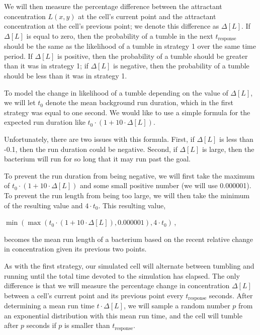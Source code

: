 We will then measure the percentage difference between the attractant concentration $L(x,y)$ at the cell's current point and the attractant concentration at the cell's previous point; we denote this difference as $\Delta[L]$. If $\Delta[L]$ is equal to zero, then the probability of a tumble in the next $t_{\text{response}}$ should be the same as the likelihood of a tumble in strategy 1 over the same time period. If $\Delta[L]$ is positive, then the probability of a tumble should be greater than it was in strategy 1; if $\Delta[L]$ is negative, then the probability of a tumble should be less than it was in strategy 1.

To model the change in likelihood of a tumble depending on the value of $\Delta[L]$, we will let $t_0$ denote the mean background run duration, which in the first strategy was equal to one second. We would like to use a simple formula for the expected run duration like $t_0 \cdot (1 + 10 \cdot \Delta[L])$.

Unfortunately, there are two issues with this formula. First, if $\Delta[L]$ is less than -0.1, then the run duration could be negative. Second, if $\Delta[L]$ is large, then the bacterium will run for so long that it may run past the goal.

To prevent the run duration from being negative, we will first take the maximum of $t_0 \cdot (1 + 10 \cdot \Delta [L])$ and some small positive number (we will use 0.000001). To prevent the run length from being too large, we will then take the minimum of the resulting value and $4 \cdot t_0$. This resulting value,

\begin{center}
$\min\left(\max(t_0 \cdot (1 + 10 \cdot \Delta [L]), 0.000001), 4 \cdot t_0\right)$\,,
\end{center}

\noindent becomes the mean run length of a bacterium based on the recent relative change in concentration given its previous two points.\\

\begin{qbox}\end{qbox}

As with the first strategy, our simulated cell will alternate between tumbling and running until the total time devoted to the simulation has elapsed. The only difference is that we will measure the percentage change in concentration $\Delta [L]$ between a cell's current point and its previous point every $t_{\text{response}}$ seconds. After determining a mean run time $t \cdot \Delta [L]$, we will sample a random number $p$ from an exponential distribution with this mean run time, and the cell will tumble after $p$ seconds if $p$ is smaller than $t_{\text{response}}$.

